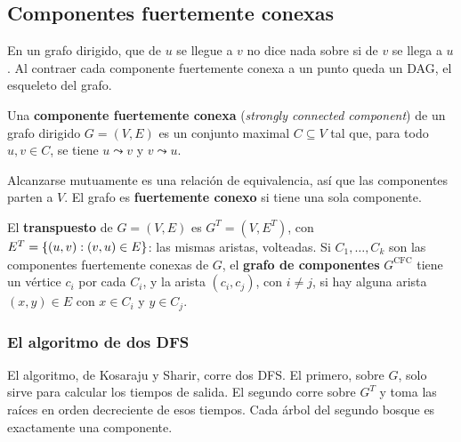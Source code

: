 \documentclass[11pt,letterpaper]{article}
\begin{document}
\subsection*{Componentes fuertemente conexas}

En un grafo dirigido, que de $u$ se llegue a $v$ no dice nada sobre si
de $v$ se llega a $u$. Al contraer cada componente fuertemente conexa
a un punto queda un DAG, el esqueleto del grafo.

\begin{definicion}
  \label{def:componente-fuerte}
  Una \textbf{componente fuertemente conexa} (\textit{strongly
  connected component}) de un grafo dirigido $G = (V, E)$ es un
  conjunto maximal $C \subseteq V$ tal que, para todo $u, v \in C$, se
  tiene $u \leadsto v$ y $v \leadsto u$.
\end{definicion}

Alcanzarse mutuamente es una relación de equivalencia, así que las
componentes parten a $V$. El grafo es \textbf{fuertemente conexo} si
tiene una sola componente.

\begin{definicion}
  \label{def:grafo-componentes}
  El \textbf{transpuesto} de $G = (V, E)$ es $G^T = (V, E^T)$, con
  $E^T = \left\{ (u, v) : (v, u) \in E \right\}$: las mismas aristas, volteadas.
  Si $C_1, \dots, C_k$ son las componentes fuertemente conexas de $G$,
  el \textbf{grafo de componentes} $G^{\text{CFC}}$ tiene un vértice
  $c_i$ por cada $C_i$, y la arista $(c_i, c_j)$, con $i \neq j$, si
  hay alguna arista $(x, y) \in E$ con $x \in C_i$ y $y \in C_j$.
\end{definicion}

\subsubsection*{El algoritmo de dos DFS}

El algoritmo, de Kosaraju y Sharir, corre dos DFS. El primero, sobre
$G$, solo sirve para calcular los tiempos de salida. El segundo corre
sobre $G^T$ y toma las raíces en orden decreciente de esos tiempos.
Cada árbol del segundo bosque es exactamente una componente.
\end{document}
